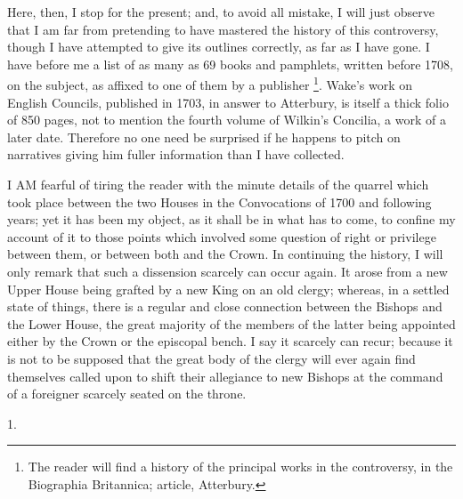 Here, then, I stop for the
present; and, to avoid all mistake, I will just observe that I am far
from pretending to have mastered the history of this controversy,
though I have attempted to give its outlines correctly, as far as I
have gone. I have before me a list of as many as 69 books and
pamphlets, written before 1708, on the subject, as affixed to one of
them by a publisher \footnote{

The reader will find a history
of the principal works in the controversy, in the Biographia
Britannica; article, Atterbury.}. Wake's
work on English Councils, published in 1703, in answer to Atterbury,
is itself a thick folio of 850 pages, not to mention the fourth volume
of Wilkin's Concilia, a work of a later date. Therefore no one need be
surprised if he happens to pitch on narratives giving him fuller
information than I have collected.


I AM fearful of tiring the
reader with the minute details of the quarrel which took place between
the two Houses in the Convocations of 1700 and following years; yet it
has been my object, as it shall be in what has to come, to confine my
account of it to those points which involved some question of right or
privilege between them, or between both and the Crown. In continuing
the history, I will only remark that such a dissension scarcely can
occur again. It arose from a new Upper House being grafted by a new
King on an old clergy; whereas, in a settled state of things, there is
a regular and close connection between the Bishops and the Lower
House, the great majority of the members of the latter being appointed
either by the Crown or the episcopal bench. I say it scarcely can
recur; because it is not to be supposed that the great body of the
clergy will ever again find themselves called upon to shift their
allegiance to new Bishops at the command of a foreigner scarcely
seated on the throne.

1.

